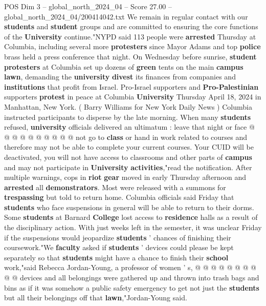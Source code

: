 \begin{textsample}{POS Dim 3 – global\_north\_2024\_04 – Score 27.00 – global\_north\_2024\_04/200414042.txt}
We remain in regular contact with our \textbf{students} and \textbf{student} groups and are committed to ensuring the core functions of the \textbf{University} continue."NYPD said 113 people were \textbf{arrested} Thursday at Columbia, including several more \textbf{protesters} since Mayor Adams and top \textbf{police} brass held a press conference that night.
On Wednesday before sunrise, \textbf{student} \textbf{protesters} at Columbia set up dozens of \textbf{green} tents on the main \textbf{campus} \textbf{lawn}, demanding the \textbf{university} \textbf{divest} its finances from companies and \textbf{institutions} that profit from Israel.
Pro-Israel supporters and \textbf{Pro-Palestinian} supporters \textbf{protest} in peace at Columbia \textbf{University} Thursday April 18, 2024 in Manhattan, New York. ( Barry Williams for New York Daily News ) Columbia instructed participants to disperse by the late morning.
When many \textbf{students} refused, \textbf{university} officials delivered an ultimatum : leave that night or face @ @ @ @ @ @ @ @ @ @ not go to \textbf{class} or hand in work related to courses and therefore may not be able to complete your current courses.
Your CUID will be deactivated, you will not have access to classrooms and other parts of \textbf{campus} and may not participate in \textbf{University} \textbf{activities},"read the notification.
After multiple warnings, cops in \textbf{riot} \textbf{gear} moved in early Thursday afternoon and \textbf{arrested} all \textbf{demonstrators}.
Most were released with a summons for \textbf{trespassing} but told to return home.
Columbia officials said Friday that \textbf{students} who face suspensions in general will be able to return to their dorms.
Some \textbf{students} at Barnard \textbf{College} lost access to \textbf{residence} halls as a result of the disciplinary action.
With just weeks left in the semester, it was unclear Friday if the suspensions would jeopardize \textbf{students} ' chances of finishing their coursework."We \textbf{faculty} asked if \textbf{students} ' devices could please be kept separately so that \textbf{students} might have a chance to finish their \textbf{school} work,"said Rebecca Jordan-Young, a professor of women ' s, @ @ @ @ @ @ @ @ @ @ devices and all belongings were gathered up and thrown into trash bags and bins as if it was somehow a public safety emergency to get not just the \textbf{students} but all their belongings off that \textbf{lawn},"Jordan-Young said.

\end{textsample}
